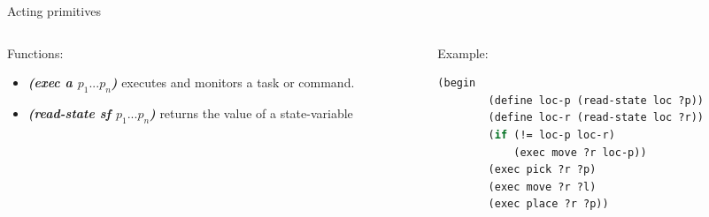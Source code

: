 \begin{frame}[fragile]{Acting primitives}
    \begin{columns}
        \begin{column}{0.5\textwidth}
            Functions:
            \begin{itemize}
                \pause
                    \item \textbf{\textit{(exec a $p_1...p_n$)}} executes and monitors a task or command.
                \pause
                    \item \textbf{\textit{(read-state sf $p_1...p_n$)}} returns the value of a state-variable
                \end{itemize}
        \end{column}
    \pause
        \begin{column}{0.5\textwidth}
               
        Example:
    \small
        \lstset{columns=fullflexible}
        \begin{lstlisting}[language = lisp]
    (begin
        (define loc-p (read-state loc ?p))
        (define loc-r (read-state loc ?r))
        (if (!= loc-p loc-r)
            (exec move ?r loc-p))
        (exec pick ?r ?p) 
        (exec move ?r ?l)
        (exec place ?r ?p))             
        \end{lstlisting}
        \end{column}
    \end{columns}
    \end{frame}


